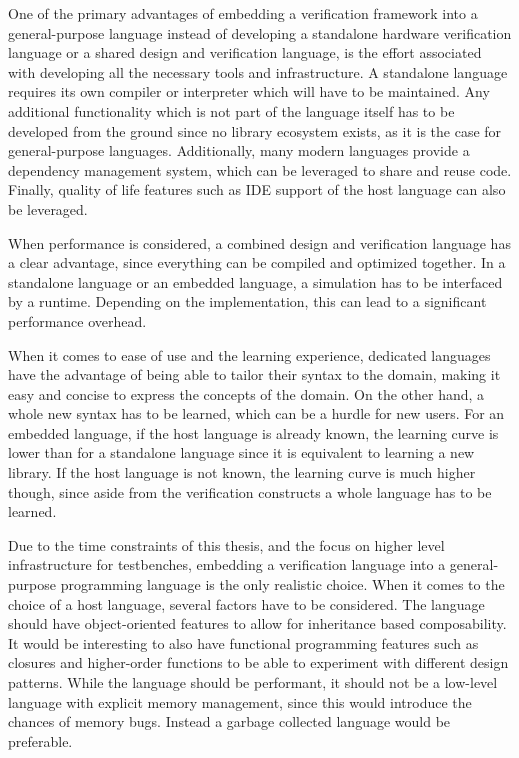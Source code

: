 One of the primary advantages of embedding a verification framework into a general-purpose language instead of
developing a standalone hardware verification language or a shared design and verification language, is the effort
associated with developing all the necessary tools and infrastructure. A standalone language requires its own
compiler or interpreter which will have to be maintained. Any additional functionality which is not part of the
language itself has to be developed from the ground since no library ecosystem exists, as it is the case for
general-purpose languages. Additionally, many modern languages provide a dependency management system, which can be
leveraged to share and reuse code. Finally, quality of life features such as IDE support of the host language can
also be leveraged.

When performance is considered, a combined design and verification language has a clear advantage, since everything
can be compiled and optimized together. In a standalone language or an embedded language, a simulation has to be
interfaced by a runtime. Depending on the implementation, this can lead to a significant performance overhead.

When it comes to ease of use and the learning experience, dedicated languages have the advantage of being able to
tailor their syntax to the domain, making it easy and concise to express the concepts of the domain. On the other
hand, a whole new syntax has to be learned, which can be a hurdle for new users. For an embedded language, if the
host language is already known, the learning curve is lower than for a standalone language since it is equivalent to
learning a new library. If the host language is not known, the learning curve is much higher though, since aside from
the verification constructs a whole language has to be learned.

Due to the time constraints of this thesis, and the focus on higher level infrastructure for testbenches, embedding a
verification language into a general-purpose programming language is the only realistic choice. When it comes to the
choice of a host language, several factors have to be considered. The language should have object-oriented features
to allow for inheritance based composability. It would be interesting to also have functional programming features
such as closures and higher-order functions to be able to experiment with different design patterns. While the
language should be performant, it should not be a low-level language with explicit memory management, since this
would introduce the chances of memory bugs. Instead a garbage collected language would be preferable.

